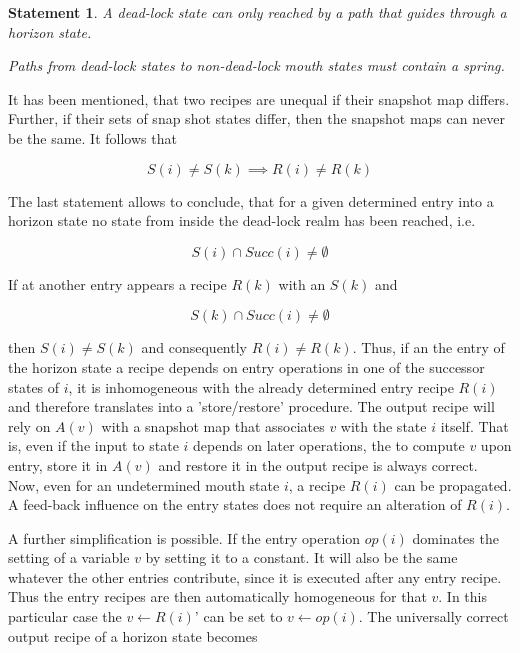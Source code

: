 \documentclass[12pt,a4paper]{scrartcl}
\theoremstyle{break}
\newtheorem{statement}{Statement}
\begin{document}
\begin{statement}
A dead-lock state can only reached by a path that guides through a horizon
state. 

Paths from dead-lock states to non-dead-lock mouth states must contain a
spring.
\end{statement}
   
It has been mentioned, that two recipes are unequal if their snapshot map
differs.  Further, if their sets of snap shot states differ, then the snapshot
maps can never be the same. It follows that

\begin{equation}
                   S(i) \neq S(k) \implies R(i) \neq R(k)
\end{equation}

The last statement allows to conclude, that for a given determined entry into a
horizon state no state from inside the dead-lock realm has been reached, i.e.

\begin{equation}
              S(i) \cap Succ(i) \neq \emptyset
\end{equation}

If at another entry appears a recipe $R(k)$ with an $S(k)$ and 

\begin{equation}
              S(k) \cap Succ(i) \neq \emptyset
\end{equation}

then \(S(i) \neq S(k)\) and consequently \(R(i) \neq R(k)\). Thus, if an the entry of
the horizon state a recipe depends on entry operations in one of the successor
states of $i$, it is inhomogeneous with the already determined entry recipe
$R(i)$ and therefore translates into a 'store/restore' procedure. The output
recipe will rely on $A(v)$ with a snapshot map that associates $v$ with the
state $i$ itself. That is, even if the input to state $i$ depends on later
operations, the to compute $v$ upon entry, store it in $A(v)$ and restore it in
the output recipe is always correct. Now, even for an undetermined mouth state
$i$, a recipe $R(i)$ can be propagated.  A feed-back influence on the entry
states does not require an alteration of $R(i)$.

A further simplification is possible. If the entry operation $op(i)$ dominates
the setting of a variable $v$ by setting it to a constant.  It will also be the
same whatever the other entries contribute, since it is executed after any
entry recipe. Thus the entry recipes are then automatically homogeneous for
that $v$. In this particular case the $v \leftarrow R(i)$' can be set to $v \leftarrow
op(i)$.  The universally correct output recipe of a horizon state becomes 
\end{document}

